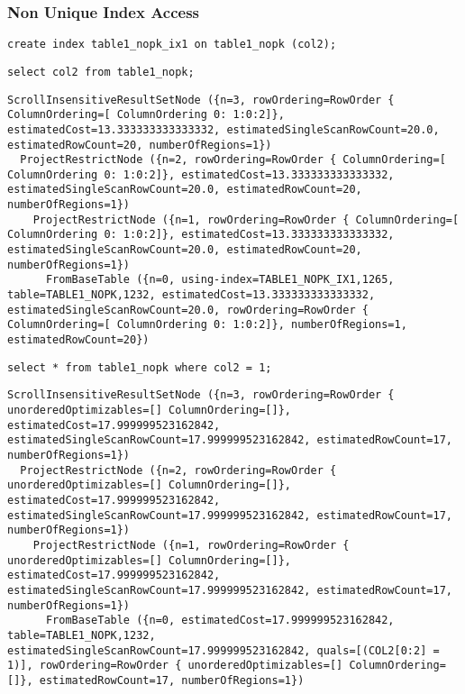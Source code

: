 \subsubsection{Non Unique Index Access}
\begin{verbatim}
create index table1_nopk_ix1 on table1_nopk (col2);
\end{verbatim}

\begin{verbatim}
select col2 from table1_nopk;
\end{verbatim}

\begin{verbatim}
ScrollInsensitiveResultSetNode ({n=3, rowOrdering=RowOrder { ColumnOrdering=[ ColumnOrdering 0: 1:0:2]}, estimatedCost=13.333333333333332, estimatedSingleScanRowCount=20.0, estimatedRowCount=20, numberOfRegions=1})
  ProjectRestrictNode ({n=2, rowOrdering=RowOrder { ColumnOrdering=[ ColumnOrdering 0: 1:0:2]}, estimatedCost=13.333333333333332, estimatedSingleScanRowCount=20.0, estimatedRowCount=20, numberOfRegions=1})
    ProjectRestrictNode ({n=1, rowOrdering=RowOrder { ColumnOrdering=[ ColumnOrdering 0: 1:0:2]}, estimatedCost=13.333333333333332, estimatedSingleScanRowCount=20.0, estimatedRowCount=20, numberOfRegions=1})
      FromBaseTable ({n=0, using-index=TABLE1_NOPK_IX1,1265, table=TABLE1_NOPK,1232, estimatedCost=13.333333333333332, estimatedSingleScanRowCount=20.0, rowOrdering=RowOrder { ColumnOrdering=[ ColumnOrdering 0: 1:0:2]}, numberOfRegions=1, estimatedRowCount=20})
\end{verbatim}

\begin{verbatim}
select * from table1_nopk where col2 = 1;
\end{verbatim}

\begin{verbatim}
ScrollInsensitiveResultSetNode ({n=3, rowOrdering=RowOrder { unorderedOptimizables=[] ColumnOrdering=[]}, estimatedCost=17.999999523162842, estimatedSingleScanRowCount=17.999999523162842, estimatedRowCount=17, numberOfRegions=1})
  ProjectRestrictNode ({n=2, rowOrdering=RowOrder { unorderedOptimizables=[] ColumnOrdering=[]}, estimatedCost=17.999999523162842, estimatedSingleScanRowCount=17.999999523162842, estimatedRowCount=17, numberOfRegions=1})
    ProjectRestrictNode ({n=1, rowOrdering=RowOrder { unorderedOptimizables=[] ColumnOrdering=[]}, estimatedCost=17.999999523162842, estimatedSingleScanRowCount=17.999999523162842, estimatedRowCount=17, numberOfRegions=1})
      FromBaseTable ({n=0, estimatedCost=17.999999523162842, table=TABLE1_NOPK,1232, estimatedSingleScanRowCount=17.999999523162842, quals=[(COL2[0:2] = 1)], rowOrdering=RowOrder { unorderedOptimizables=[] ColumnOrdering=[]}, estimatedRowCount=17, numberOfRegions=1})
\end{verbatim}


